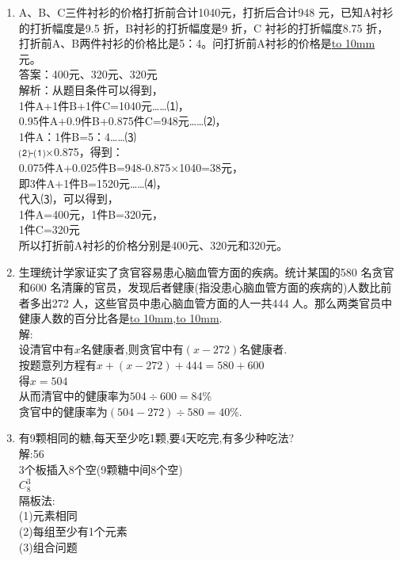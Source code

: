 \documentclass[12pt,oneside,a4paper]{ctexbook} %
\numberwithin{chapter}{part}
\begin{document}
\begin{enumerate}
\item 
A、B、C三件衬衫的价格打折前合计1040元，打折后合计948 元，已知A衬衫的打折幅度是9.5 折，B衬衫的打折幅度是9 折，C 衬衫的打折幅度8.75 折，打折前A、B两件衬衫的价格比是5：4。问打折前A衬衫的价格是\underline{\hbox to 10mm{}} 元。\\
答案：400元、320元、320元\\
解析：从题目条件可以得到，\\
1件A+1件B+1件C=1040元……⑴，\\
0.95件A+0.9件B+0.875件C=948元……⑵，\\
1件A：1件B=5：4……⑶\\
⑵-⑴×0.875，得到：\\
0.075件A+0.025件B=948-0.875×1040=38元，\\
即3件A+1件B=1520元……⑷，\\
代入⑶，可以得到，\\
1件A=400元，1件B=320元，\\
1件C=320元\\
所以打折前A衬衫的价格分别是400元、320元和320元。

\item 
生理统计学家证实了贪官容易患心脑血管方面的疾病。统计某国的580 名贪官和600 名清廉的官员，发现后者健康(指没患心脑血管方面的疾病的)人数比前者多出272 人，这些官员中患心脑血管方面的人一共444 人。那么两类官员中健康人数的百分比各是\underline{\hbox to 10mm{}},\underline{\hbox to 10mm{}}.\\
解:\\
设清官中有$x$名健康者,则贪官中有$(x-272)$名健康者.\\
按题意列方程有$x+(x-272)+444=580+600$\\
得$x=504$\\
从而清官中的健康率为$504\div600=84\%$\\
贪官中的健康率为$(504-272)\div580 =40\%$.

\item 
有9颗相同的糖,每天至少吃1颗,要4天吃完,有多少种吃法?\\
解:56\\
3个板插入8个空(9颗糖中间8个空)\\
$C_{8}^{3}$\\
隔板法:\\
(1)元素相同\\
(2)每组至少有1个元素\\
(3)组合问题


\end{enumerate}
\end{document}
